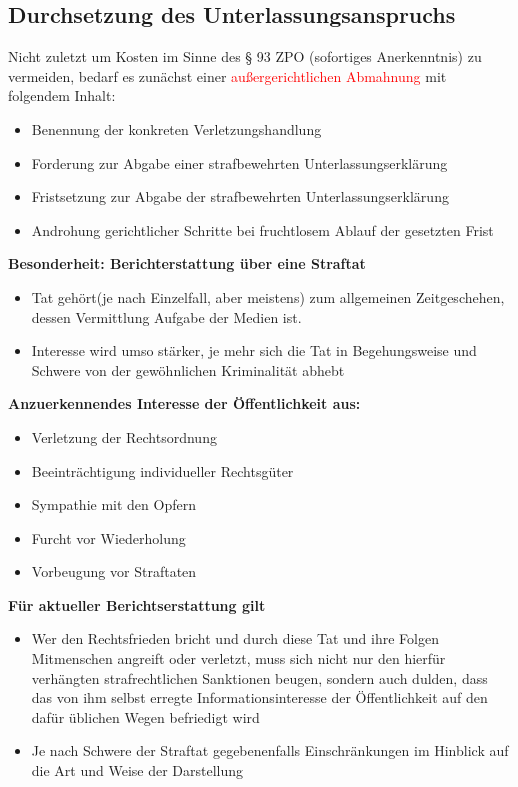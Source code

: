 \subsection{Durchsetzung des Unterlassungsanspruchs}
Nicht zuletzt um Kosten im Sinne des § 93 ZPO (sofortiges Anerkenntnis) zu vermeiden, bedarf es zunächst einer \textcolor{red}{außergerichtlichen Abmahnung} mit folgendem Inhalt:
\begin{itemize}
    \item Benennung der konkreten Verletzungshandlung
    \item Forderung zur Abgabe einer strafbewehrten Unterlassungserklärung
    \item Fristsetzung zur Abgabe der strafbewehrten Unterlassungserklärung
    \item Androhung gerichtlicher Schritte bei fruchtlosem Ablauf der gesetzten Frist
\end{itemize}
\textbf{Besonderheit: Berichterstattung über eine Straftat}
\begin{itemize}
    \item Tat gehört(je nach Einzelfall, aber meistens) zum allgemeinen Zeitgeschehen, dessen Vermittlung Aufgabe der Medien ist.
    \item Interesse wird umso stärker, je mehr sich die Tat in Begehungsweise und Schwere von der gewöhnlichen Kriminalität abhebt
\end{itemize}
\textbf{Anzuerkennendes Interesse der Öffentlichkeit aus:}
\begin{itemize}
    \item Verletzung der Rechtsordnung
    \item Beeinträchtigung individueller Rechtsgüter
    \item Sympathie mit den Opfern
    \item Furcht vor Wiederholung
    \item Vorbeugung vor Straftaten
\end{itemize}
\textbf{Für aktueller Berichtserstattung gilt}
\begin{itemize}
    \item Wer den Rechtsfrieden bricht und durch diese Tat und ihre Folgen Mitmenschen angreift oder verletzt, muss sich nicht nur den hierfür verhängten strafrechtlichen Sanktionen beugen, sondern auch dulden, dass das von ihm selbst erregte Informationsinteresse der Öffentlichkeit auf den dafür üblichen Wegen befriedigt wird
    \item Je nach Schwere der Straftat gegebenenfalls Einschränkungen im Hinblick auf die Art und Weise der Darstellung
\end{itemize}
